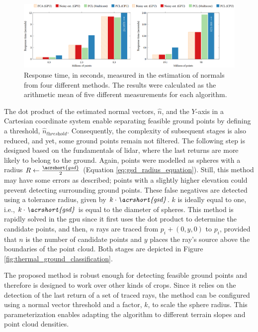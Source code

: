 \begin{figure}
    \centering
    \includegraphics[width=\linewidth]{figs/thermal_projection/response_time_normals.png}
    \caption{Response time, in seconds, measured in the estimation of normals from four different methods. The results were calculated as the arithmetic mean of five different measurements for each algorithm. }
	\label{fig:thermal_normal_response_time}
\end{figure}

The dot product of the estimated normal vectors, $\hat{n}$, and the $Y$-axis in a Cartesian coordinate system enable separating feasible ground points by defining a threshold, $\hat{n}_{\textit{threshold}}$. Consequently, the complexity of subsequent stages is also reduced, and yet, some ground points remain not filtered. The following step is designed based on the fundamentals of \acrshort{lidar}, where the last returns are more likely to belong to the ground. Again, points were modelled as spheres with a radius $R \gets \frac{\acrshort{gsd}}{2}$ (Equation \ref{eq:gsd_radius_equation}). Still, this method may have some errors as described; points with a slightly higher elevation could prevent detecting surrounding ground points. These false negatives are detected using a tolerance radius, given by $k \cdot \textit{\acrshort{gsd}}$. $k$ is ideally equal to one, i.e., $k \cdot \textit{\acrshort{gsd}}$ is equal to the diameter of spheres. This method is rapidly solved in the \acrshort{gpu} since it first uses the dot product to determine the candidate points, and then, $n$ rays are traced from $p_i + (0, y, 0)$ to $p_i$, provided that $n$ is the number of candidate points and $y$ places the ray's source above the boundaries of the point cloud. Both stages are depicted in Figure \ref{fig:thermal_ground_classification}. 

\begin{kaobox}[frametitle=Application of the proposed classification to other environments]
The proposed method is robust enough for detecting feasible ground points and therefore is designed to work over other kinds of crops. Since it relies on the detection of the last return of a set of traced rays, the method can be configured using a normal vector threshold and a factor, $k$, to scale the sphere radius. This parameterization enables adapting the algorithm to different terrain slopes and point cloud densities.
\end{kaobox}

